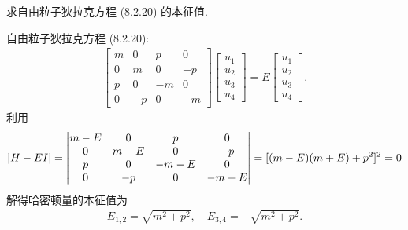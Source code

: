 \documentclass{assignment}
\begin{document}
\begin{prob}[课本习题 8.11]
    求自由粒子狄拉克方程 (8.2.20) 的本征值.
\end{prob}
\begin{sol}
    自由粒子狄拉克方程 (8.2.20):
    \begin{align}
        \begin{bmatrix}
            m&0&p&0\\
            0&m&0&-p\\
            p&0&-m&0\\
            0&-p&0&-m
        \end{bmatrix}\begin{bmatrix}
            u_1\\
            u_2\\
            u_3\\
            u_4
        \end{bmatrix}=E\begin{bmatrix}
            u_1\\
            u_2\\
            u_3\\
            u_4
        \end{bmatrix}.
    \end{align}
    利用
    \begin{align}
        \left\lvert H-EI\right\rvert=\begin{vmatrix}
            m-E&0&p&0\\
            0&m-E&0&-p\\
            p&0&-m-E&0\\
            0&-p&0&-m-E
        \end{vmatrix}=[(m-E)(m+E)+p^2]^2=0
    \end{align}
    解得哈密顿量的本征值为
    \begin{align}
        E_{1,2}=\sqrt{m^2+p^2},\quad E_{3,4}=-\sqrt{m^2+p^2}.
    \end{align}
\end{sol}
\end{document}
